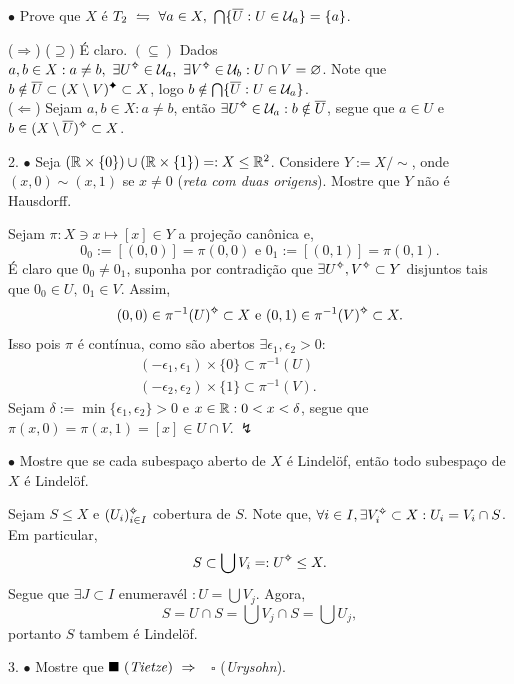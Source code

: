\(\bullet \) Prove que \(X\) é \(T_2  \ \leftrightharpoons \ \forall a \in X, \ \bigcap\{\overline{U}: U \in \mathcal{U}_a\} = \{a\}\). 

\textcolor{gris}{(\(\Rightarrow\)) (\(\supseteq\)) É claro. \((\subseteq)\) Dados \(a,b \in X : a \neq b, \ \exists U\ab\in \U_a, \ \exists V\ab\in \U_b : U\cap V = \varnothing\). Note que \(b\notin \overline{U} \subset (X\setminus V)\ce\subset X\), logo \(b \notin \bigcap\{\overline{U} : U \in \mathcal{U}_a\}\). \\ 
(\(\Leftarrow\)) Sejam \(a,b \in X : a \neq b\), então \(\exists U\ab\in \U_a: b\notin \overline{U}\), segue que \(a \in U\) e \(b \in (X\setminus \overline{U})\ab \subset X\). } 

2. \(\bullet\) Seja \((\mathbb{R} \times \{0\}) \cup (\mathbb{R}\times \{1\}) =: X \leq \mathbb{R}^2\). Considere \(Y := X  / \sim \), onde \((x,0) \sim (x,1)\) se \(x\neq 0\) (\emph{reta com duas origens}). Mostre que \(Y\) não é Hausdorff.  

\textcolor{gris}{Sejam \(\pi: X \ni x\mapsto [x] \in Y\) a projeção canônica e, 
\[0_0 := [(0,0)] = \pi(0,0) \text{ e }0_1 := [(0,1)] = \pi(0,1).\] 
É claro que \(0_0 \neq 0_1\), suponha por contradição que \(\exists U\ab, V\ab \subset Y\) disjuntos tais que \(0_0 \in U, \ 0_1 \in V\). Assim, 
\[(0,0) \in \pi^{-1}(U)\ab\subset X \text{ e } (0,1) \in \pi^{-1}(V)\ab \subset X.\]
Isso pois \(\pi \) é contínua, como são abertos \(\exists \epsilon_1, \epsilon_2 > 0  :\) 
\begin{align*}
(-\epsilon_1, \epsilon_1) \times \{0\} \subset \pi^{-1}(U) \hspace{2cm}\\ 
(-\epsilon_2, \epsilon_2) \times \{1\} \subset \pi^{-1}(V)  .
\end{align*}
Sejam \(\delta:= \min \{\epsilon_1, \epsilon_2\}>0\) e \(x\in \mathbb{R} : 0< x< \delta\), segue que \(\pi(x,0) = \pi(x,1)  = [x] \in U\cap V. \ \lightning \)  
}   

\(\bullet \) Mostre que se cada subespaço aberto de \(X\) é Lindelöf, então todo subespaço de \(X\) é Lindelöf.  

\textcolor{gris}{Sejam \(S \leq X\) e \((U_i)_{i\in I}\ab\) cobertura de \(S\). Note que,  \(\forall i \in I, \exists V_i\ab \subset X : U_i = V_i \cap S\). Em particular, 
\[S \subset \bigcup V_i =: U\ab \leq X. \]
Segue que \(\exists J\subset I \) enumeravél \(: U = \bigcup V_j\). Agora,   
\[S = U \cap S = \bigcup V_j \cap S = \bigcup U_j, \]
portanto \(S\) tambem é Lindelöf. 
} 

3. \(\bullet\) Mostre que \(\blacksquare \text{ (\emph{Tietze}) }\Rightarrow \)\ \  {\scriptsize $\square$} (\emph{Urysohn}).  

